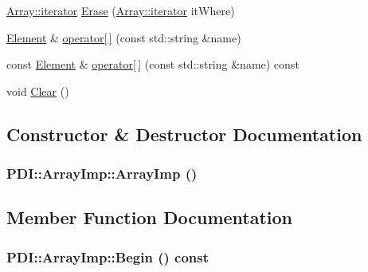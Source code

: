 \begin{CompactItemize}
\item 
\hyperlink{class_p_d_i_1_1_array_ea216852e304c9b15049c0e595378d1d}{Array::iterator} \hyperlink{class_p_d_i_1_1_array_imp_ece55ed8ebce204458461523b0d22ff7}{Erase} (\hyperlink{class_p_d_i_1_1_array_ea216852e304c9b15049c0e595378d1d}{Array::iterator} itWhere)
\item 
\hyperlink{class_p_d_i_1_1_element}{Element} \& \hyperlink{class_p_d_i_1_1_array_imp_de880158e2f8beb39a5a06dd6a999597}{operator\mbox{[}$\,$\mbox{]}} (const std::string \&name)
\item 
const \hyperlink{class_p_d_i_1_1_element}{Element} \& \hyperlink{class_p_d_i_1_1_array_imp_1dcbc6d8fa28b3f110a0ddc4364bddba}{operator\mbox{[}$\,$\mbox{]}} (const std::string \&name) const 
\item 
void \hyperlink{class_p_d_i_1_1_array_imp_f45c328dc8d5a217285cd51c08491993}{Clear} ()
\end{CompactItemize}


\subsection{Constructor \& Destructor Documentation}
\hypertarget{class_p_d_i_1_1_array_imp_9321a7adb9c1104332789e4b0a848a3f}{
\subsubsection[{ArrayImp}]{\setlength{\rightskip}{0pt plus 5cm}PDI::ArrayImp::ArrayImp ()}}
\label{class_p_d_i_1_1_array_imp_9321a7adb9c1104332789e4b0a848a3f}




\subsection{Member Function Documentation}
\hypertarget{class_p_d_i_1_1_array_imp_654604fca0ac6af51d7a0335e5f4e440}{
\subsubsection[{Begin}]{ PDI::ArrayImp::Begin () const}}
\label{class_p_d_i_1_1_array_imp_654604fca0ac6af51d7a0335e5f4e440}


